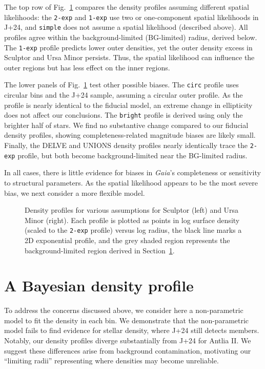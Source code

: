 The top row of Fig.~\ref{fig:scl_umi_density_extras} compares the
density profiles assuming different spatial likelihoods: the
\texttt{2-exp} and \texttt{1-exp} use two or one-component spatial
likelihoods in J+24, and \texttt{simple} does not assume a spatial
likelihood (described above). All profiles agree within the
background-limited (BG-limited) radius, derived below. The
\texttt{1-exp} profile predicts lower outer densities, yet the outer
density excess in Sculptor and Ursa Minor persists. Thus, the spatial
likelihood can influence the outer regions but has less effect on the
inner regions.

The lower panels of Fig.~\ref{fig:scl_umi_density_extras} test other
possible biases. The \texttt{circ} profile uses circular bins and the
J+24 sample, assuming a circular outer profile. As the profile is nearly
identical to the fiducial model, an extreme change in ellipticity does
not affect our conclusions. The \texttt{bright} profile is derived using
only the brighter half of stars. We find no substantive change compared
to our fiducial density profiles, showing completeness-related magnitude
biases are likely small. Finally, the DELVE and UNIONS density profiles
nearly identically trace the \texttt{2-exp} profile, but both become
background-limited near the BG-limited radius.

In all cases, there is little evidence for biases in \emph{Gaia}'s
completeness or sensitivity to structural parameters. As the spatial
likelihood appears to be the most severe bias, we next consider a more
flexible model.

\begin{figure}
\centering
{}
\caption[Density methodology comparison]{Density profiles for various
assumptions for Sculptor (left) and Ursa Minor (right). Each profile is
plotted as points in log surface density (scaled to the \texttt{2-exp}
profile) versus log radius, the black line marks a 2D exponential
profile, and the grey shaded region represents the background-limited
region derived in
Section~\ref{sec:mcmc_hists}.}\label{fig:scl_umi_density_extras}
\end{figure}

\section{A Bayesian density profile}\label{sec:mcmc_hists}

To address the concerns discussed above, we consider here a
non-parametric model to fit the density in each bin. We demonstrate that
the non-parametric model fails to find evidence for stellar density,
where J+24 still detects members. Notably, our density profiles diverge
substantially from J+24 for Antlia II. We suggest these differences
arise from background contamination, motivating our ``limiting radii''
representing where densities may become unreliable.


